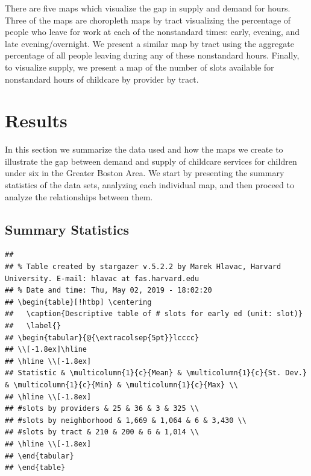 \documentclass[10pt,letterpaper]{article}
\begin{document}
There are five maps which visualize the gap in supply and demand for
hours. Three of the maps are choropleth maps by tract visualizing the
percentage of people who leave for work at each of the nonstandard
times: early, evening, and late evening/overnight. We present a similar
map by tract using the aggregate percentage of all people leaving during
any of these nonstandard hours. Finally, to visualize supply, we present
a map of the number of slots available for nonstandard hours of
childcare by provider by tract.

\section{Results}\label{results}

In this section we summarize the data used and how the maps we create to
illustrate the gap between demand and supply of childcare services for
children under six in the Greater Boston Area. We start by presenting
the summary statistics of the data sets, analyzing each individual map,
and then proceed to analyze the relationships between them.

\subsection{Summary Statistics}\label{summary-statistics}

\begin{verbatim}
## 
## % Table created by stargazer v.5.2.2 by Marek Hlavac, Harvard University. E-mail: hlavac at fas.harvard.edu
## % Date and time: Thu, May 02, 2019 - 18:02:20
## \begin{table}[!htbp] \centering 
##   \caption{Descriptive table of # slots for early ed (unit: slot)} 
##   \label{} 
## \begin{tabular}{@{\extracolsep{5pt}}lcccc} 
## \\[-1.8ex]\hline 
## \hline \\[-1.8ex] 
## Statistic & \multicolumn{1}{c}{Mean} & \multicolumn{1}{c}{St. Dev.} & \multicolumn{1}{c}{Min} & \multicolumn{1}{c}{Max} \\ 
## \hline \\[-1.8ex] 
## #slots by providers & 25 & 36 & 3 & 325 \\ 
## #slots by neighborhood & 1,669 & 1,064 & 6 & 3,430 \\ 
## #slots by tract & 210 & 200 & 6 & 1,014 \\ 
## \hline \\[-1.8ex] 
## \end{tabular} 
## \end{table}
\end{verbatim}
\end{document}
